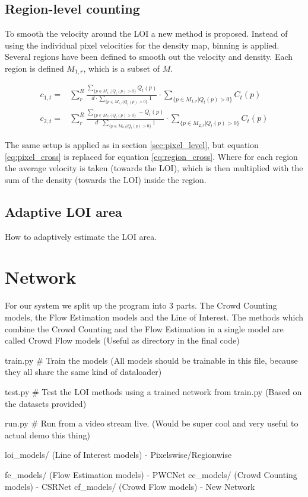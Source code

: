 \subsection{Region-level counting}
To smooth the velocity around the LOI a new method is proposed. Instead of using the individual pixel velocities for the density map, binning is applied. Several regions have been defined to smooth out the velocity and density. Each region is defined $M_{1,r}$, which is a subset of $M$.

\begin{equation}
	\begin{aligned}
		c_{1,t} =& \sum^R_{r} \frac{\sum_{\{p \in M_{1,r} | Q_t(p) > 0\}} Q_t(p)}
		{d \cdot \sum_{\{p \in M_{1,r} | Q_t(p) > 0\}} 1} \cdot \sum_{\{p \in M_{1,r} | Q_t(p) > 0\}} C_t(p)\\
		c_{2,t} =& \sum^R_{r} \frac{\sum_{\{p \in M_{2,r} | Q_t(p) > 0\}} -Q_t(p)}
		{d \cdot \sum_{\{p \in M_{2,r} | Q_t(p) > 0\}} 1} \cdot \sum_{\{p \in M_{2,r} | Q_t(p) > 0\}} C_t(p)
	\end{aligned}
	\label{eq:region_cross}
\end{equation}

The same setup is applied as in section \ref{sec:pixel_level}, but equation \ref{eq:pixel_cross} is replaced for equation \ref{eq:region_cross}. Where for each region the average velocity is taken (towards the LOI), which is then multiplied with the sum of the density (towards the LOI) inside the region.


\subsection{Adaptive LOI area}
How to adaptively estimate the LOI area.


\section{Network}


For our system we split up the program into 3 parts. The Crowd Counting models, the Flow Estimation models and the Line of Interest. The methods which combine the Crowd Counting and the Flow Estimation in a single model are called Crowd Flow models (Useful as directory in the final code)

train.py \# Train the models (All models should be trainable in this file, because they all share the same kind of dataloader)

test.py \# Test the LOI methods using a trained network from train.py (Based on the datasets provided)

run.py \# Run from a video stream live. (Would be super cool and very useful to actual demo this thing)

loi\_models/ (Line of Interest models) - Pixelswise/Regionwise

fe\_models/ (Flow Estimation models) - PWCNet
cc\_models/ (Crowd Counting models) - CSRNet
cf\_models/ (Crowd Flow models) - New Network

